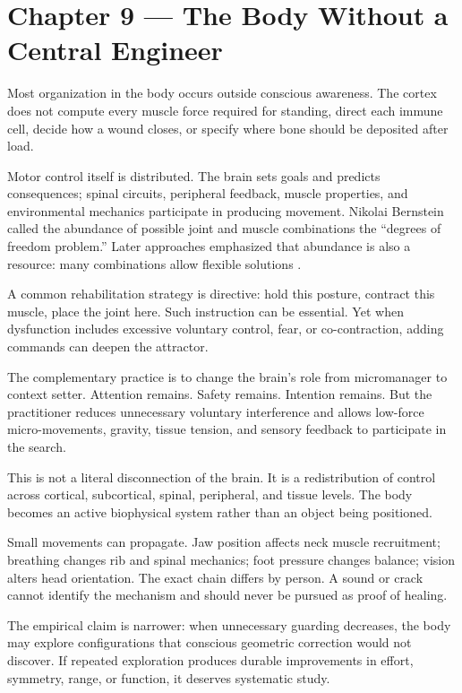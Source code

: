\chapter{Chapter 9 --- The Body Without a Central Engineer}\label{chapter-9-the-body-without-a-central-engineer}

Most organization in the body occurs outside conscious awareness. The cortex does not compute every muscle force required for standing, direct each immune cell, decide how a wound closes, or specify where bone should be deposited after load.

Motor control itself is distributed. The brain sets goals and predicts consequences; spinal circuits, peripheral feedback, muscle properties, and environmental mechanics participate in producing movement. Nikolai Bernstein called the abundance of possible joint and muscle combinations the ``degrees of freedom problem.'' Later approaches emphasized that abundance is also a resource: many combinations allow flexible solutions \autocite{latash2012bliss,todorov2002optimal}.

A common rehabilitation strategy is directive: hold this posture, contract this muscle, place the joint here. Such instruction can be essential. Yet when dysfunction includes excessive voluntary control, fear, or co-contraction, adding commands can deepen the attractor.

The complementary practice is to change the brain's role from micromanager to context setter. Attention remains. Safety remains. Intention remains. But the practitioner reduces unnecessary voluntary interference and allows low-force micro-movements, gravity, tissue tension, and sensory feedback to participate in the search.

This is not a literal disconnection of the brain. It is a redistribution of control across cortical, subcortical, spinal, peripheral, and tissue levels. The body becomes an active biophysical system rather than an object being positioned.

Small movements can propagate. Jaw position affects neck muscle recruitment; breathing changes rib and spinal mechanics; foot pressure changes balance; vision alters head orientation. The exact chain differs by person. A sound or crack cannot identify the mechanism and should never be pursued as proof of healing.

The empirical claim is narrower: when unnecessary guarding decreases, the body may explore configurations that conscious geometric correction would not discover. If repeated exploration produces durable improvements in effort, symmetry, range, or function, it deserves systematic study.
